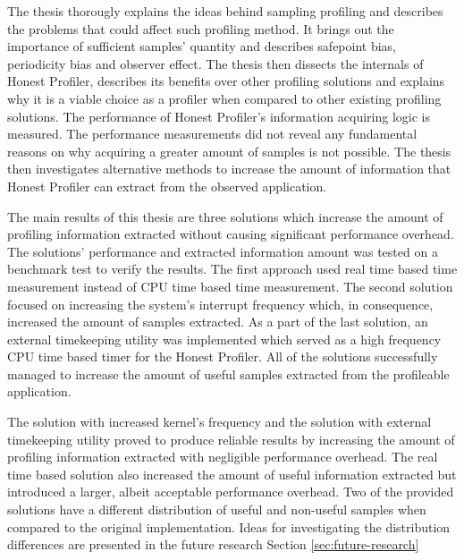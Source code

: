 \documentclass[..thesis.tex]{subfiles}
\begin{document}
The thesis thorougly explains the ideas behind sampling profiling and describes the problems that could affect such profiling method. It brings out the importance of sufficient samples' quantity and describes safepoint bias, periodicity bias and observer effect. The thesis then dissects the internals of Honest Profiler, describes its benefits over other profiling solutions and explains why it is a viable choice as a profiler when compared to other existing profiling solutions. The performance of Honest Profiler's information acquiring logic is measured. The performance measurements did not reveal any fundamental reasons on why acquiring a greater amount of samples is not possible. The thesis then investigates alternative methods to increase the amount of information that Honest Profiler can extract from the observed application.

The main results of this thesis are three solutions which increase the amount of profiling information extracted without causing significant performance overhead. The solutions' performance and extracted information amount was tested on a benchmark test to verify the results. The first approach used real time based time measurement instead of CPU time based time measurement. The second solution focused on increasing the system's interrupt frequency which, in consequence, increased the amount of samples extracted. As a part of the last solution, an external timekeeping utility was implemented which served as a high frequency CPU time based timer for the Honest Profiler. All of the solutions successfully managed to increase the amount of useful samples extracted from the profileable application.

The solution with increased kernel's frequency and the solution with external timekeeping utility proved to produce reliable results by increasing the amount of profiling information extracted with negligible performance overhead. The real time based solution also increased the amount of useful information extracted but introduced a larger, albeit acceptable performance overhead.
Two of the provided solutions have a different distribution of useful and non-useful samples when compared to the original implementation. Ideas for investigating the distribution differences are presented in the future research Section \ref{sec:future-research}
\end{document}
